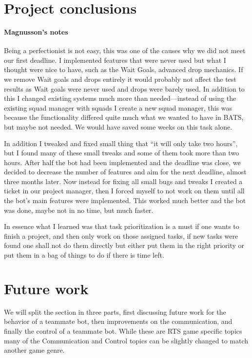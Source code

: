 \section{Project conclusions}
\paragraph{Magnusson's notes}
Being a perfectionist is not easy, this was one of the causes why we did not meet our first
deadline. I implemented features that were never used but what I thought were nice to have, such as
the Wait Goals, advanced drop mechanics. If we remove Wait goals and drops entirely it would
probably not affect the test results as Wait goals were never used and drops were barely used.
In addition to this I changed existing systems much more than
needed—instead of using the existing squad manager with squads I create a new squad manager, this
was because the functionality differed quite much what we wanted to have in BATS, but maybe not
needed. We would have saved some weeks on this task alone.

In addition I tweaked and fixed small thing that ``it will only take two hours'', but I found many
of these small tweaks and some of them took more than two hours. After half the bot had been
implemented and the deadline was close, we decided to decrease the number of features and aim for
the next deadline, almost three months later. Now instead for fixing all small bugs and tweaks I
created a ticket in our project manager, then I forced myself to not work on them until all the
bot's main features were implemented. This worked much better and the bot was done, maybe not in no
time, but much faster.

In essence what I learned was that task prioritization is a must if one wants to finish a project,
and then only work on those assigned tasks, if new tasks were found one shall not do them directly
but either put them in the right priority or put them in a bag of things to do if there is time
left.

\section{Future work}
We will split the section in three parts, first discussing future work for the behavior of a
teammate bot, then improvements on the communication, and finally the control of a teammate bot.
While these are RTS game specific topics many of the Communication and Control topics can be
slightly changed to match another game genre.

